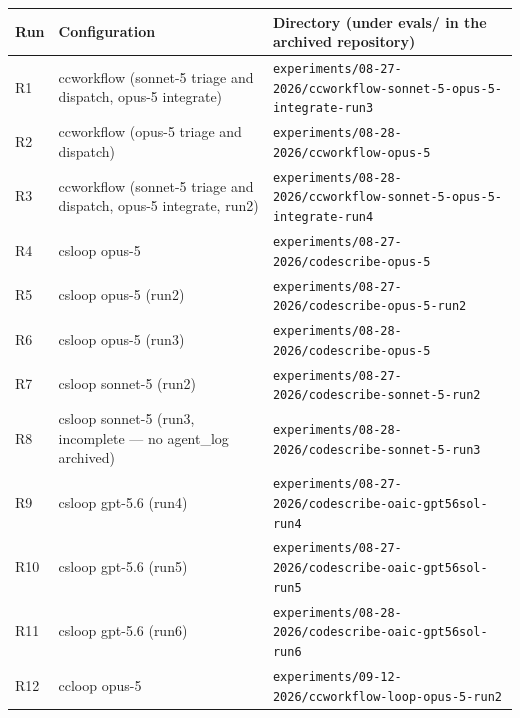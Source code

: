 \setlength{\tabcolsep}{3.2pt}
\begin{tabular}{@{}lll@{}}
  \toprule
  Run & Configuration & Directory (under {\ttfamily evals/} in the archived repository) \\
  \midrule
    R1 & ccworkflow (sonnet-5 triage and dispatch, opus-5 integrate) & \texttt{experiments/08-27-2026/ccworkflow-sonnet-5-opus-5-integrate-run3} \\
    R2 & ccworkflow (opus-5 triage and dispatch) & \texttt{experiments/08-28-2026/ccworkflow-opus-5} \\
    R3 & ccworkflow (sonnet-5 triage and dispatch, opus-5 integrate, run2) & \texttt{experiments/08-28-2026/ccworkflow-sonnet-5-opus-5-integrate-run4} \\
    R4 & csloop opus-5 & \texttt{experiments/08-27-2026/codescribe-opus-5} \\
    R5 & csloop opus-5 (run2) & \texttt{experiments/08-27-2026/codescribe-opus-5-run2} \\
    R6 & csloop opus-5 (run3) & \texttt{experiments/08-28-2026/codescribe-opus-5} \\
    R7 & csloop sonnet-5 (run2) & \texttt{experiments/08-27-2026/codescribe-sonnet-5-run2} \\
    R8 & csloop sonnet-5 (run3, incomplete — no agent\_log archived) & \texttt{experiments/08-28-2026/codescribe-sonnet-5-run3} \\
    R9 & csloop gpt-5.6 (run4) & \texttt{experiments/08-27-2026/codescribe-oaic-gpt56sol-run4} \\
    R10 & csloop gpt-5.6 (run5) & \texttt{experiments/08-27-2026/codescribe-oaic-gpt56sol-run5} \\
    R11 & csloop gpt-5.6 (run6) & \texttt{experiments/08-28-2026/codescribe-oaic-gpt56sol-run6} \\
    R12 & ccloop opus-5 & \texttt{experiments/09-12-2026/ccworkflow-loop-opus-5-run2} \\
  \bottomrule
\end{tabular}
